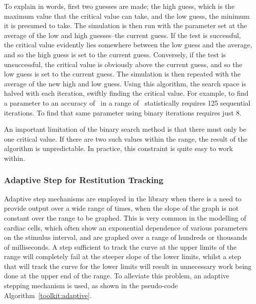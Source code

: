 To explain in words, first two guesses are made; the high guess, which is the
maximum value that the critical value can take, and the low guess, the minimum
it is presumed to take.  The simulation is then run with the parameter set at
the average of the low and high guesses--the current guess.  If the test is
successful, the critical value evidently lies somewhere between the low guess
and the average, and so the high guess is set to the current guess.  Conversely,
if the test is unsuccessful, the critical value is obviously above the current
guess, and so the low guess is set to the current guess.  The simulation is then
repeated with the average of the new high and low guess.  Using this algorithm,
the search space is halved with each iteration, swiftly finding the critical
value.
For example, to find a parameter to an accuracy of \ in a range of
\ statistically requires 125 sequential iterations.
To find that same parameter using binary iterations requires just 8.

An important limitation of the binary search method is that there must only be
one critical value.
If there are two such values within the range, the result of the algorithm is
unpredictable.
In practice, this constraint is quite easy to work within.

\subsubsection{Adaptive Step for Restitution Tracking}

Adaptive step mechanisms are employed in the library when there is a need to
provide output over a wide range of times, when the slope of the graph is not
constant over the range to be graphed.  This is very common in the modelling of
cardiac cells, which often show an exponential dependence of various parameters
on the  stimulus interval, and are graphed over a range of hundreds or thousands
of milliseconds.  A step sufficient to track the curve at the upper limits
of the range will completely fail at the steeper slope of the lower limits,
whilst a step that will track the curve for the lower limits will result in
unnecessary work being done at the upper end of the range.  To alleviate this
problem, an adaptive stepping mechanism is used, as shown in the pseudo-code
Algorithm~\ref{toolkit:adaptive}.

